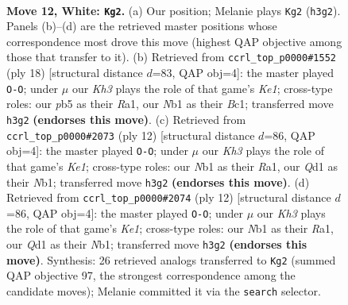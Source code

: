 \documentclass[11pt]{article}
\begin{document}
\begin{figure}[p]\centering
\begin{subfigure}{0.46\textwidth}\centering
\resizebox{\linewidth}{!}{%
\newchessgame
\chessboard[
  setfen={rn1q1rk1/4bpp1/5n2/pppp3p/8/1P2PNPK/P2P1P1P/RNBQ1R2 w - - 0 12},
  showmover=false,
  pgfstyle=straightmove, color=movearrow, markmove={h3-g2}
]}
\caption{}
\end{subfigure}\hfill
\begin{subfigure}{0.46\textwidth}\centering
\resizebox{\linewidth}{!}{%
\newchessgame
\chessboard[
  setfen={r1bq1rk1/1ppn1ppp/4pn2/p7/P1pP4/2P2NP1/4PPBP/R1BQK2R w KQ - 0 10},
  showmover=false,
  pgfstyle=straightmove, color=movearrow, markmove={e1-g1}
]}
\caption{}
\end{subfigure}
\\[4pt]
\begin{subfigure}{0.46\textwidth}\centering
\resizebox{\linewidth}{!}{%
\newchessgame
\chessboard[
  setfen={rnbq1rk1/pp1pp1bp/5np1/2p2p2/2PP4/1P3NP1/P3PPBP/RNBQK2R w KQ - 0 7},
  showmover=false,
  pgfstyle=straightmove, color=movearrow, markmove={e1-g1}
]}
\caption{}
\end{subfigure}\hfill
\begin{subfigure}{0.46\textwidth}\centering
\resizebox{\linewidth}{!}{%
\newchessgame
\chessboard[
  setfen={rnbq1rk1/pp1pp1bp/5np1/2p2p2/2PP4/1P3NP1/P3PPBP/RNBQK2R w KQ - 0 7},
  showmover=false,
  pgfstyle=straightmove, color=movearrow, markmove={e1-g1}
]}
\caption{}
\end{subfigure}
\caption{\textbf{Move 12, White: \texttt{Kg2}.} (a) Our position; Melanie plays \texttt{Kg2} (\texttt{h3g2}). Panels (b)--(d) are the retrieved master positions whose correspondence most drove this move (highest QAP objective among those that transfer to it). (b) Retrieved from \texttt{ccrl\_top\_p0000\#1552} (ply 18) [structural distance $d$=83, QAP obj=4]: the master played \texttt{O-O}; under $\mu$ our \emph{Kh3} plays the role of that game's \emph{Ke1}; cross-type roles: our \emph{p}b5 as their \emph{R}a1, our \emph{N}b1 as their \emph{B}c1; transferred move \texttt{h3g2} \textbf{(endorses this move)}. (c) Retrieved from \texttt{ccrl\_top\_p0000\#2073} (ply 12) [structural distance $d$=86, QAP obj=4]: the master played \texttt{O-O}; under $\mu$ our \emph{Kh3} plays the role of that game's \emph{Ke1}; cross-type roles: our \emph{N}b1 as their \emph{R}a1, our \emph{Q}d1 as their \emph{N}b1; transferred move \texttt{h3g2} \textbf{(endorses this move)}. (d) Retrieved from \texttt{ccrl\_top\_p0000\#2074} (ply 12) [structural distance $d$=86, QAP obj=4]: the master played \texttt{O-O}; under $\mu$ our \emph{Kh3} plays the role of that game's \emph{Ke1}; cross-type roles: our \emph{N}b1 as their \emph{R}a1, our \emph{Q}d1 as their \emph{N}b1; transferred move \texttt{h3g2} \textbf{(endorses this move)}. Synthesis: 26 retrieved analogs transferred to \texttt{Kg2} (summed QAP objective 97, the strongest correspondence among the candidate moves); Melanie committed it via the \texttt{search} selector.}
\label{fig:thought-m22}
\end{figure}
\end{document}
